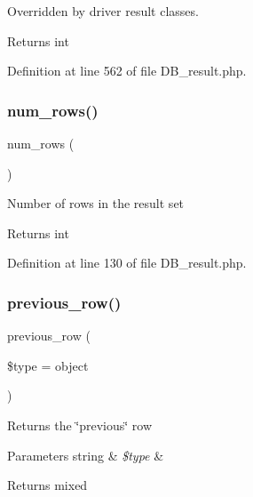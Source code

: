 Overridden by driver result classes.

\begin{DoxyReturn}{Returns}
int 
\end{DoxyReturn}


Definition at line 562 of file D\+B\+\_\+result.\+php.

\mbox{\label{class_c_i___d_b__result_a218657c303ee499b97710ab0cd2f5d6e}} 
\subsubsection{\texorpdfstring{num\_rows()}{num\_rows()}}
{\footnotesize\ttfamily num\+\_\+rows (\begin{DoxyParamCaption}{ }\end{DoxyParamCaption})}

Number of rows in the result set

\begin{DoxyReturn}{Returns}
int 
\end{DoxyReturn}


Definition at line 130 of file D\+B\+\_\+result.\+php.

\mbox{\label{class_c_i___d_b__result_a458567a19d160a814b41b2964ec192ce}} 
\subsubsection{\texorpdfstring{previous\_row()}{previous\_row()}}
{\footnotesize\ttfamily previous\+\_\+row (\begin{DoxyParamCaption}\item[{}]{\$type = {\ttfamily \textquotesingle{}object\textquotesingle{}} }\end{DoxyParamCaption})}

Returns the \char`\"{}previous\char`\"{} row


\begin{DoxyParams}[1]{Parameters}
string & {\em \$type} & \\
\hline
\end{DoxyParams}
\begin{DoxyReturn}{Returns}
mixed 
\end{DoxyReturn}


